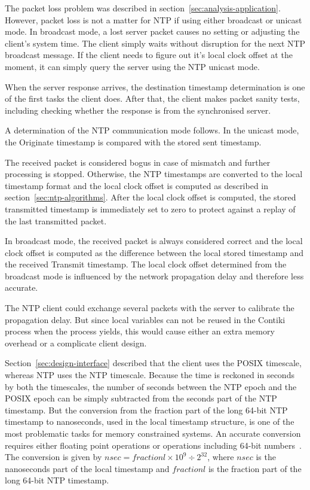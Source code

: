 The packet loss problem was described in section~\ref{sec:analysis-application}.
However, packet loss is not a matter for NTP if using either broadcast or unicast mode.
In broadcast mode, a lost server packet causes no setting or adjusting the client's system time.
The client simply waits without disruption for the next NTP broadcast message.
If the client needs to figure out it's local clock offset at the moment,
it can simply query the server using the NTP unicast mode.



When the server response arrives,
the destination timestamp determination is one of the first tasks the client does.
After that, the client makes packet sanity tests, including
checking whether the response is from the synchronised server.

A determination of the NTP communication mode follows.
In the unicast mode, the Originate timestamp is compared with the stored sent timestamp.

The received packet is considered bogus in case of mismatch and further processing is stopped.
Otherwise, the NTP timestamps are converted to the local timestamp format and
the local clock offset is computed as described in section~\ref{sec:ntp-algorithms}.
After the local clock offset is computed,
the stored transmitted timestamp is immediately set to zero
to protect against a replay of the last transmitted packet.

In broadcast mode, the received packet is always considered correct
and the local clock offset is computed as the difference between the local stored timestamp
and the received Transmit timestamp.
The local clock offset determined from the broadcast mode
is influenced by the network propagation delay and therefore less accurate.

The NTP client could exchange several packets with the server to calibrate the propagation delay.
But since local variables can not be reused in the Contiki process when the process yields,
this would cause either an extra memory overhead or a complicate client design.





Section~\ref{sec:design-interface} described that the client uses the POSIX timescale,
whereas NTP uses the NTP timescale.
Because the time is reckoned in seconds by both the timescales,
the number of seconds between the NTP epoch and the POSIX epoch
can be simply subtracted from the seconds part of the NTP timestamp.
But the conversion from the fraction part of the long 64-bit NTP timestamp to nanoseconds,
used in the local timestamp structure,
is one of the most problematic tasks for memory constrained systems.
An accurate conversion requires either floating point operations or operations including 64-bit numbers~\cite{c99}.
The conversion is given by
$nsec = fractionl \times 10^9 \div 2^{32}$, where $nsec$ is the nanoseconds part of the local timestamp
and $fractionl$ is the fraction part of the long 64-bit NTP timestamp.

